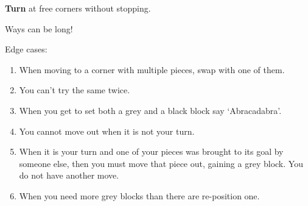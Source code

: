     
    \textbf{Turn} at free corners without stopping. 

    Ways can be long!
    
    

  

    \skipper

\raggedright

\vspace{5ex}

Edge cases:

    \begin{enumerate}
        \item When moving to a corner with multiple pieces, swap with one of them.
        \item You can't try the same twice.
        \item When you get to set both a grey and a black block say `Abracadabra'.
        \item You cannot move out when it is not your turn.
        \item When it is your turn and one of your pieces was brought to its goal by someone else, then you must move that piece out, gaining a grey block. You do not have another move.
        \item When you need more grey blocks than there are re-position one.
    \end{enumerate}

\hrulefill






